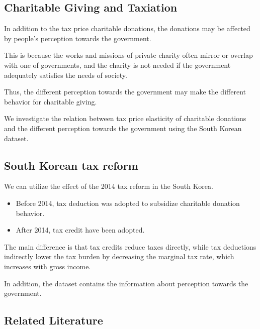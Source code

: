 \documentclass[ review  , 3p ]{elsarticle}
\providecommand{\tightlist}{%
  \setlength{\itemsep}{0pt}\setlength{\parskip}{0pt}}
\begin{document}
  \hypertarget{charitable-giving-and-taxiation-1}{%
  \subsection{Charitable Giving and Taxiation}\label{charitable-giving-and-taxiation-1}}
  
  In addition to the tax price charitable donations, the donations may be affected by people's perception towards the government.
  
  This is because the works and missions of private charity often mirror or overlap with one of governments, and the charity is not needed if the government adequately satisfies the needs of society.
  
  Thus, the different perception towards the government may make the different behavior for charitable giving.
  
  We investigate the relation between tax price elasticity of charitable donations and the different perception towards the government using the South Korean dataset.
  
  \hypertarget{south-korean-tax-reform}{%
  \subsection{South Korean tax reform}\label{south-korean-tax-reform}}
  
  We can utilize the effect of the 2014 tax reform in the South Korea.
  
  \begin{itemize}
  \tightlist
  \item
    Before 2014, tax deduction was adopted to subsidize charitable donation behavior.
  \item
    After 2014, tax credit have been adopted.
  \end{itemize}
  
  The main difference is that tax credits reduce taxes directly, while tax deductions indirectly lower the tax burden by decreasing the marginal tax rate, which increases with gross income.
  
  In addition, the dataset contains the information about perception towards the government.
  
  \hypertarget{related-literature}{%
  \subsection{Related Literature}\label{related-literature}}
  
\end{document}
